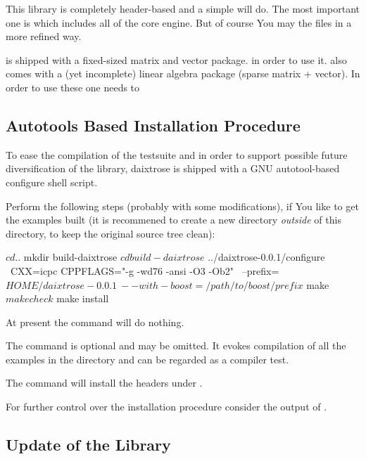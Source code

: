 This library is completely header-based and a simple 
 will do. The most important one is
 which includes all of the core engine. But of
course You may  the files in a more refined way.

\Daixtrose is shipped with a fixed-sized matrix and vector package.
 in order to use it.
\Daixtrose also comes with a (yet incomplete) linear algebra package (sparse
matrix + vector). In order to use these one needs to 

\subsection{Autotools Based Installation Procedure}
\label{sec: Autotools Based Installation Procedure}

To ease the compilation of the testsuite and in order to support possible future
diversification of the library, daixtrose is shipped with a GNU autotool-based
configure shell script.

Perform the following steps (probably with some modifications), if You like to
get the examples built (it is recommened to create a new directory
\emph{outside} of this directory, to keep the original source tree clean):

\begin{code}
  $ cd ..  
  $ mkdir build-daixtrose 
  $ cd build-daixtrose 
  $ ../daixtrose-0.0.1/configure \ 
  CXX=icpc CPPFLAGS="-g -wd76 -ansi -O3 -Ob2" \ 
  --prefix=$HOME/daixtrose-0.0.1 \ 
  --with-boost=/path/to/boost/prefix
  
  $ make 
  $ make check 
  $ make install
\end{code}

At present the command  will do nothing.

The command  is optional and may be omitted. 
It evokes compilation of all the examples in the directory 
and can be regarded as a compiler test.

The command \somecode{make install} will install the headers under 
\somecode{prefix/include}.%

For further control over the installation procedure consider the
output of .


\subsection{Update of the Library}
\label{sec: Update of the Library}

